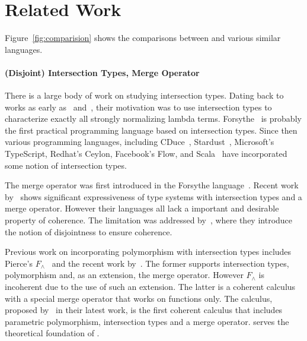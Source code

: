 \section{Related Work}
\label{sec:related}

Figure~\ref{fig:comparision} shows the comparisons between \name and various
similar languages.


\paragraph{(Disjoint) Intersection Types, Merge Operator}

There is a large body of work on studying intersection types. Dating back to
works as early as~\citet{coppo1981functional} and~\citet{pottinger1980type},
their motivation was to use intersection types to characterize exactly all
strongly normalizing lambda terms. Forsythe~\cite{reynolds1997design} is
probably the first practical programming language based on intersection types.
Since then various programming languages, including
CDuce~\cite{benzaken2003cduce}, Stardust~\cite{Dunfield07:Stardust}, Microsoft's
TypeScript, Redhat's Ceylon, Facebook's Flow, and Scala~\cite{scala-overview}
have incorporated some notion of intersection types.

The merge operator was first introduced in the Forsythe
language~\cite{reynolds1997design}. Recent work
by~\citet{dunfield2014elaborating} shows significant expressiveness of type
systems with intersection types and a merge operator. However their languages
all lack a important and desirable property of coherence. The limitation was
addressed by~\citet{oliveira2016disjoint}, where they introduce the notion of
disjointness to ensure coherence.

Previous work on incorporating polymorphism with intersection types includes
Pierce's $F_\wedge$~\cite{pierce1991programming2} and the recent work
by~\citet{Castagna:2014}. The former supports intersection types, polymorphism
and, as an extension, the merge operator. However $F_\wedge$ is incoherent due
to the use of such an extension. The latter is a coherent calculus with a
special merge operator that works on functions only. The \bname calculus,
proposed by~\citet{alpuimdisjoint} in their latest work, is the first coherent
calculus that includes parametric polymorphism, intersection types and a merge
operator. \bname serves the theoretical foundation of \name.



